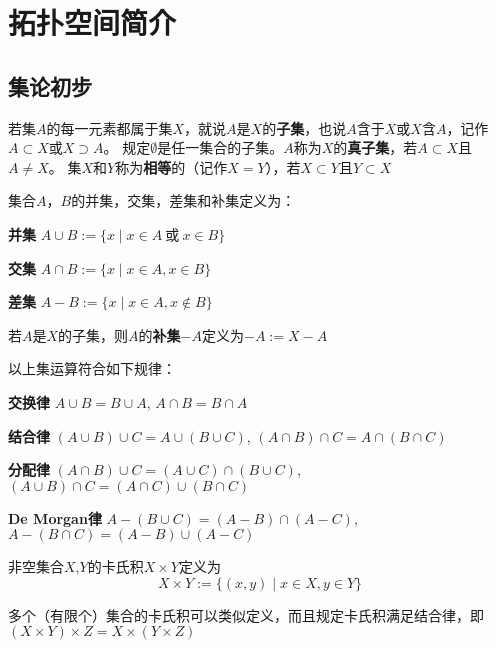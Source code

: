 \chapter{拓扑空间简介}
\section{集论初步}

\begin{definition}
若集$A$的每一元素都属于集$X$，就说$A$是$X$的\textbf{子集}，也说$A$含于$X$或$X$含$A$，记作$A \subset X$或$X \supset A$。
规定$\emptyset$是任一集合的子集。$A$称为$X$的\textbf{真子集}，若$A \subset X$且$A \neq X$。
集$X$和$Y$称为\textbf{相等}的（记作$X = Y$），若$X \subset Y$且$Y \subset X$
\end{definition}

\begin{definition}
集合$A$，$B$的并集，交集，差集和补集定义为：

\textbf{并集} $A \cup B := \{x \mid x \in A ~ \text{或} ~ x \in B\}$

\textbf{交集} $A \cap B := \{x \mid x \in A, x \in B\}$

\textbf{差集} $A - B := \{x \mid x \in A, x \notin B\}$

若$A$是$X$的子集，则$A$的\textbf{补集}$-A$定义为$-A := X - A$

\end{definition}

\begin{theorem}
以上集运算符合如下规律：

\textbf{交换律} $A \cup B = B \cup A$, $A \cap B = B \cap A$

\textbf{结合律} $(A \cup B) \cup C = A \cup (B \cup C)$, $(A \cap B) \cap C = A \cap (B \cap C)$

\textbf{分配律} $(A \cap B) \cup C = (A \cup C) \cap (B \cup C)$, $(A \cup B) \cap C = (A \cap C) \cup (B \cap C)$

\textbf{De Morgan律} $A - (B \cup C) = (A - B) \cap (A - C)$, $A - (B \cap C) = (A - B) \cup (A - C)$

\end{theorem}

\begin{definition}
非空集合$X$,$Y$的卡氏积$X \times Y$定义为
$$X \times Y := \{(x, y) \mid x \in X, y \in Y\}$$
\end{definition}
多个（有限个）集合的卡氏积可以类似定义，而且规定卡氏积满足结合律，即$(X \times Y) \times Z = X \times (Y \times Z)$

